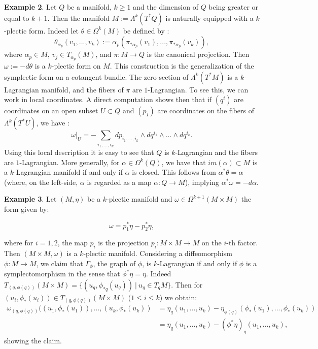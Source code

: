 \documentclass[a4paper,12pt,leqno]{article}
\begin{document}
\noindent \textbf{Example 2}. Let $Q$ be a manifold, $k \geq 1$ and the dimension of $Q$ being greater or equal to $k{+}1$. 
Then the manifold $M:=\Lambda^k(T^*Q)$ is naturally equipped with a $k$-plectic form. 
Indeed let $\theta\in \Omega^k(M)$ be defined by :
\begin{equation*}
\theta_{\alpha_p}(v_1,...,v_k):=\alpha_p(\pi_{*\alpha_p}(v_1),...,\pi_{*\alpha_p}(v_k)),
\end{equation*}
where $\alpha_p\in M$, $v_j\in T_{\alpha_p}(M)$, and $\pi:M\rightarrow Q$ is the canonical projection. Then $\omega:=-d\theta$ 
is a $k$-plectic form on $M$. This construction is the generalization of the symplectic form on a cotangent bundle. The 
zero-section of $\Lambda^k(T^*M)$ is a $k$-Lagrangian manifold, and the fibers of $\pi$ are $1$-Lagrangian. To see this, we can work 
in local coordinates. A direct computation shows then that if $(q^i)$ are coordinates on an open subset $U\subset Q$ and 
$(p_I)$ are coordinates on the fibers of $\Lambda^k(T^*U)$, we have :
\begin{equation*}
\omega|_U=- \sum_{i_1,...,i_k} dp_{i_1,...,i_k}\wedge dq^{i_1}\wedge...\wedge dq^{i_k}.
\end{equation*}
Using  this local description it is easy to see that $Q$ is $k$-Lagrangian and the fibers are $1$-Lagrangian. More generally, 
for $\alpha\in \Omega^k(Q)$, we have that $im(\alpha)\subset M$ is a $k$-Lagrangian manifold if and only if $\alpha$ is closed. 
This follows from $\alpha^*\theta=\alpha$ (where, on the left-side, $\alpha$ is regarded as a map $\alpha:Q\rightarrow M$), 
implying $\alpha^*\omega=- d\alpha$. \newline

\noindent \textbf{Example 3}. Let $(M,\eta)$ be a $k$-plectic manifold and $\omega\in\Omega^{k{+}1}(M\times M)$ the form given by:

\begin{equation*}
\omega=p_1^*\eta - p_2^* \eta,
\end{equation*}

\noindent where for $i=1,2$, the map $p_i$ is the projection $p_i: M\times M\rightarrow M$ on the $i$-th factor. Then $(M\times M,\omega)$ is a 
$k$-plectic manifold. Considering a diffeomorphism $\phi:M\rightarrow M$, we claim that $\Gamma_{\phi}$, the graph of $\phi$,
 is $k$-Lagrangian if and only if $\phi$ is a symplectomorphism in the sense that $\phi^*\eta=\eta$. Indeed $T_{(q,\phi(q))}(M\times M)=\{(u_q,\phi_{*q}(u_q)) \ | \ u_q\in T_q M\}$. Then for $(u_i,\phi_*(u_i))\in T_{(q,\phi(q))}(M\times M)$ ($1\leq i \leq k$) we obtain:
\begin{align*}
\omega_{(q,\phi(q))}((u_1,\phi_*(u_1)),...,(u_k,\phi_*(u_k))&=\eta_q(u_1,...,u_k) - \eta_{\phi(q)}(\phi_*(u_1),...,\phi_*(u_k)) \\
&=\eta_q(u_1,...,u_k)-(\phi^*\eta)_q(u_1,...,u_k),
\end{align*}
showing the claim. \newline
\end{document}
